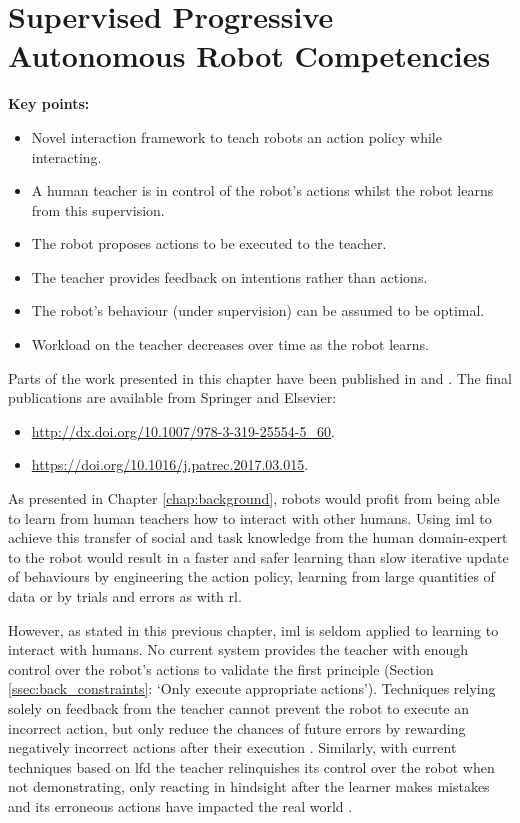 \chapter{Supervised Progressive Autonomous Robot \newline Competencies}\label{chap:sparc}
\glsresetall
\graphicspath{{images/sparc/}}

\begin{framed}
	\textbf{Key points:}
	\begin{itemize}
		\item Novel interaction framework to teach robots an action policy while interacting.
		\item A human teacher is in control of the robot's actions whilst the robot learns from this supervision.
		\item The robot proposes actions to be executed to the teacher.
		\item The teacher provides feedback on intentions rather than actions.
		\item The robot's behaviour (under supervision) can be assumed to be optimal.
		\item Workload on the teacher decreases over time as the robot learns.
	\end{itemize}
\end{framed}

Parts of the work presented in this chapter have been published in \cite{senft2015sparc} and \cite{senft2017supervised}. The final publications are available from Springer and Elsevier:
\begin{itemize}
	\item \url{http://dx.doi.org/10.1007/978-3-319-25554-5_60}.
	\item \url{https://doi.org/10.1016/j.patrec.2017.03.015}.
\end{itemize}

\newpage

As presented in Chapter \ref{chap:background}, robots would profit from being able to learn from human teachers how to interact with other humans. Using \gls{iml} to achieve this transfer of social and task knowledge from the human domain-expert to the robot would result in a faster and safer learning than slow iterative update of behaviours by engineering the action policy, learning from large quantities of data or by trials and errors as with \gls{rl}.

However, as stated in this previous chapter, \gls{iml} is seldom applied to learning to interact with humans. No current system provides the teacher with enough control over the robot's actions to validate the first principle (Section \ref{ssec:back_constraints}: `Only execute appropriate actions'). Techniques relying solely on feedback from the teacher cannot prevent the robot to execute an incorrect action, but only reduce the chances of future errors by rewarding negatively incorrect actions after their execution \citep{senft2017supervised}. Similarly, with current techniques based on \gls{lfd} the teacher relinquishes its control over the robot when not demonstrating, only reacting in hindsight after the learner makes mistakes and its erroneous actions have impacted the real world \citep{chernova2009interactive}.

